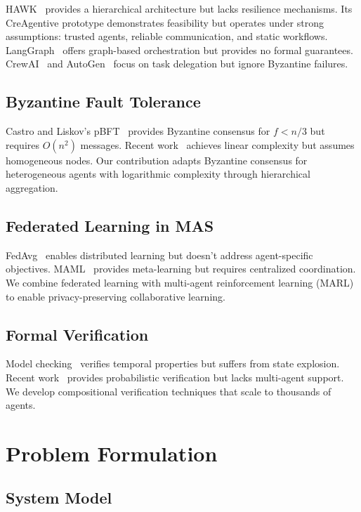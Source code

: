 \documentclass[conference]{IEEEtran}
\begin{document}
HAWK~\cite{hawk2025} provides a hierarchical architecture but lacks resilience mechanisms. Its CreAgentive prototype demonstrates feasibility but operates under strong assumptions: trusted agents, reliable communication, and static workflows. LangGraph~\cite{langgraph2024} offers graph-based orchestration but provides no formal guarantees. CrewAI~\cite{crewai2024} and AutoGen~\cite{wu2023autogen} focus on task delegation but ignore Byzantine failures.

\subsection{Byzantine Fault Tolerance}

Castro and Liskov's pBFT~\cite{castro1999practical} provides Byzantine consensus for $f < n/3$ but requires $O(n^2)$ messages. Recent work~\cite{yin2019hotstuff} achieves linear complexity but assumes homogeneous nodes. Our contribution adapts Byzantine consensus for heterogeneous agents with logarithmic complexity through hierarchical aggregation.

\subsection{Federated Learning in MAS}

FedAvg~\cite{mcmahan2017federated} enables distributed learning but doesn't address agent-specific objectives. MAML~\cite{finn2017model} provides meta-learning but requires centralized coordination. We combine federated learning with multi-agent reinforcement learning (MARL)~\cite{zhang2021multi} to enable privacy-preserving collaborative learning.

\subsection{Formal Verification}

Model checking~\cite{clarke1999model} verifies temporal properties but suffers from state explosion. Recent work~\cite{kwiatkowska2011prism} provides probabilistic verification but lacks multi-agent support. We develop compositional verification techniques that scale to thousands of agents.

\section{Problem Formulation}

\subsection{System Model}
\end{document}
